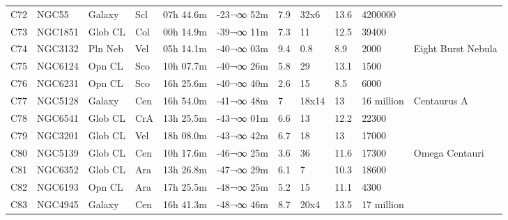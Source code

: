 \documentclass[10pt,twoside,a4paper,english]{report}
\begin{document}
\begin{longtable}{@{}lllllllllll@{}}
C72        & NGC55       & Galaxy     & Scl       & 07h 44.6m & -23¬∞ 52m  & 7.9       & 32x6                 & 13.6     & 4200000             &                                 \\ 
C73        & NGC1851     & Glob CL    & Col       & 00h 14.9m & -39¬∞ 11m  & 7.3       & 11                   & 12.5     & 39400               &                                 \\ 
C74        & NGC3132     & Pln Neb    & Vel       & 05h 14.1m & -40¬∞ 03m  & 9.4       & 0.8                  & 8.9      & 2000                & Eight Burst Nebula              \\ 
C75        & NGC6124     & Opn CL     & Sco       & 10h 07.7m & -40¬∞ 26m  & 5.8       & 29                   & 13.1     & 1500                &                                 \\ 
C76        & NGC6231     & Opn CL     & Sco       & 16h 25.6m & -40¬∞ 40m  & 2.6       & 15                   & 8.5      & 6000                &                                 \\ 
C77        & NGC5128     & Galaxy     & Cen       & 16h 54.0m & -41¬∞ 48m  & 7         & 18x14                & 13       & 16 million          & Centaurus A                     \\ 
C78        & NGC6541     & Glob CL    & CrA       & 13h 25.5m & -43¬∞ 01m  & 6.6       & 13                   & 12.2     & 22300               &                                 \\ 
C79        & NGC3201     & Glob CL    & Vel       & 18h 08.0m & -43¬∞ 42m  & 6.7       & 18                   & 13       & 17000               &                                 \\ 
C80        & NGC5139     & Glob CL    & Cen       & 10h 17.6m & -46¬∞ 25m  & 3.6       & 36                   & 11.6     & 17300               & Omega Centauri                  \\ 
C81        & NGC6352     & Glob CL    & Ara       & 13h 26.8m & -47¬∞ 29m  & 6.1       & 7                    & 10.3     & 18600               &                                 \\ 
C82        & NGC6193     & Opn CL     & Ara       & 17h 25.5m & -48¬∞ 25m  & 5.2       & 15                   & 11.1     & 4300                &                                 \\ 
C83        & NGC4945     & Galaxy     & Cen       & 16h 41.3m & -48¬∞ 46m  & 8.7       & 20x4                 & 13.5     & 17 million          &                                 \\ 

\end{longtable}
\end{document}
